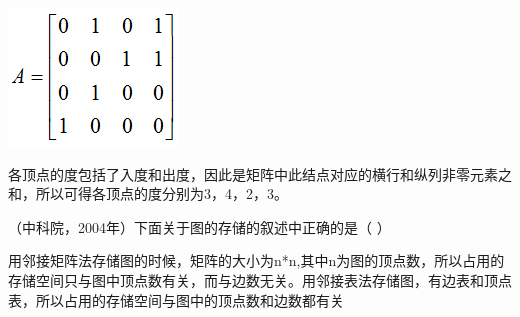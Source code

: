 \includegraphics[width=1.77083in,height=1.43750in]{computerassets/596518D94738A905011156D7D79F7DEE.png}
\par{}
\begin{solution}各顶点的度包括了入度和出度，因此是矩阵中此结点对应的横行和纵列非零元素之和，所以可得各顶点的度分别为3，4，2，3。
\end{solution}
\question （中科院，2004年）下面关于图的存储的叙述中正确的是（ ）
\par{}
\begin{solution}用邻接矩阵法存储图的时候，矩阵的大小为n*n,其中n为图的顶点数，所以占用的存储空间只与图中顶点数有关，而与边数无关。用邻接表法存储图，有边表和顶点表，所以占用的存储空间与图中的顶点数和边数都有关
\end{solution}
